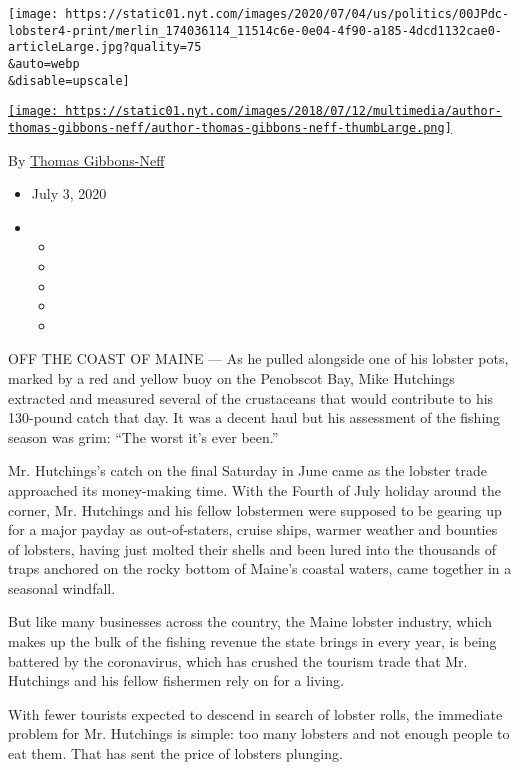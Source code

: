 \texttt{[image: https://static01.nyt.com/images/2020/07/04/us/politics/00JPdc-lobster4-print/merlin\_174036114\_11514c6e-0e04-4f90-a185-4dcd1132cae0-articleLarge.jpg?quality=75\\\&auto=webp\\\&disable=upscale]}

\href{https://www.nytimes.com/by/thomas-gibbons-neff}{\texttt{[image: https://static01.nyt.com/images/2018/07/12/multimedia/author-thomas-gibbons-neff/author-thomas-gibbons-neff-thumbLarge.png]}}

By \href{https://www.nytimes.com/by/thomas-gibbons-neff}{Thomas
Gibbons-Neff}

\begin{itemize}
\item
  July 3, 2020
\item
  \begin{itemize}
  \item
  \item
  \item
  \item
  \item
  \end{itemize}
\end{itemize}

OFF THE COAST OF MAINE --- As he pulled alongside one of his lobster
pots, marked by a red and yellow buoy on the Penobscot Bay, Mike
Hutchings extracted and measured several of the crustaceans that would
contribute to his 130-pound catch that day. It was a decent haul but his
assessment of the fishing season was grim: ``The worst it's ever been.''

Mr. Hutchings's catch on the final Saturday in June came as the lobster
trade approached its money-making time. With the Fourth of July holiday
around the corner, Mr. Hutchings and his fellow lobstermen were supposed
to be gearing up for a major payday as out-of-staters, cruise ships,
warmer weather and bounties of lobsters, having just molted their shells
and been lured into the thousands of traps anchored on the rocky bottom
of Maine's coastal waters, came together in a seasonal windfall.

But like many businesses across the country, the Maine lobster industry,
which makes up the bulk of the fishing revenue the state brings in every
year, is being battered by the coronavirus, which has crushed the
tourism trade that Mr. Hutchings and his fellow fishermen rely on for a
living.

With fewer tourists expected to descend in search of lobster rolls, the
immediate problem for Mr. Hutchings is simple: too many lobsters and not
enough people to eat them. That has sent the price of lobsters plunging.

